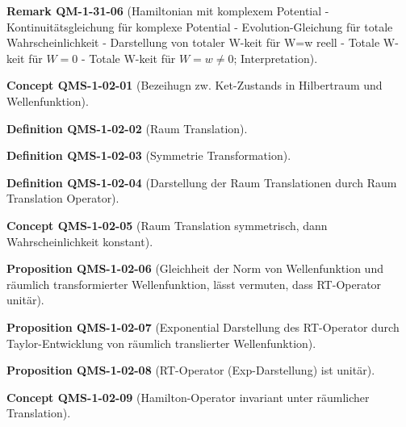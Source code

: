 \documentclass[10pt, letterpaper]{article}
\newcommand{\CustomHeading}[3]{%
  \par\medskip\noindent%
  \textbf{#1 #2} \textnormal{(#3)}.\enskip%
}
\newenvironment{DEF}[2]{\CustomHeading{Definition}{#1}{#2}}{}
\newenvironment{PROP}[2]{\CustomHeading{Proposition}{#1}{#2}}{}
\newenvironment{REM}[2]{\CustomHeading{Remark}{#1}{#2}}{}
\newenvironment{CONC}[2]{\CustomHeading{Concept}{#1}{#2}}{}
\begin{document}
\begin{REM}{QM-1-31-06}{Hamiltonian mit komplexem Potential
- Kontinuitätsgleichung für komplexe Potential
- Evolution-Gleichung für totale Wahrscheinlichkeit
- Darstellung von totaler W-keit für W=w reell
- Totale W-keit für $W=0$
- Totale W-keit für $W=w\neq 0$; Interpretation}
\end{REM}

\begin{CONC}{QMS-1-02-01}{Bezeihugn zw. Ket-Zustands in Hilbertraum und Wellenfunktion}
\end{CONC}

\begin{DEF}{QMS-1-02-02}{Raum Translation}
\end{DEF}

\begin{DEF}{QMS-1-02-03}{Symmetrie Transformation}
\end{DEF}

\begin{DEF}{QMS-1-02-04}{Darstellung der Raum Translationen durch Raum Translation Operator}
\end{DEF}

\begin{CONC}{QMS-1-02-05}{Raum Translation symmetrisch, dann Wahrscheinlichkeit konstant}
\end{CONC}

\begin{PROP}{QMS-1-02-06}{Gleichheit der Norm von Wellenfunktion und räumlich transformierter Wellenfunktion, lässt vermuten, dass RT-Operator unitär}
\end{PROP}

\begin{PROP}{QMS-1-02-07}{Exponential Darstellung des RT-Operator durch Taylor-Entwicklung von räumlich translierter Wellenfunktion}
\end{PROP}

\begin{PROP}{QMS-1-02-08}{RT-Operator (Exp-Darstellung) ist unitär}
\end{PROP}

\begin{CONC}{QMS-1-02-09}{Hamilton-Operator invariant unter räumlicher Translation}
\end{CONC}
\end{document}
